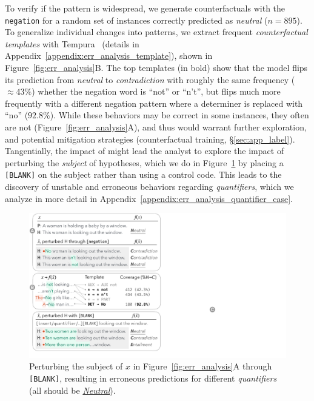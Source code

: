 To verify if the pattern is widespread, we generate counterfactuals with the \texttt{negation} \tagstr for a random set of instances correctly predicted as \emph{neutral} ($n=895$). To generalize individual changes into patterns, we extract frequent \emph{counterfactual templates} with Tempura~\cite{wu2020tempura} (details in Appendix~\ref{appendix:err_analysis_template}), shown in Figure~\ref{fig:err_analysis}B.
The top templates (in bold) show that the model flips its prediction from \emph{neutral} to \emph{contradiction} with roughly the same frequency (${\approx}43\%$) whether the negation word is ``not'' or ``n't'', but flips much more frequently with a different negation pattern where a determiner is replaced with ``no'' ($92.8\%$). While these behaviors may be correct in some instances, they often are not (\eg Figure~\ref{fig:err_analysis}A), and thus would warrant further exploration, and potential mitigation strategies (\eg counterfactual training, \S\ref{sec:app_label}).
Tangentially, the impact of  might lead the analyst to explore the impact of perturbing the \emph{subject} of hypotheses, which we do in Figure~\ref{fig:err_analysis_quantifier} by placing a \texttt{[BLANK]} on the subject rather than using a control code.
This leads to the discovery of unstable and erroneous behaviors regarding \emph{quantifiers}, which we analyze in more detail in Appendix~\ref{appendix:err_analysis_quantifier_case}.


\begin{figure}[t]
\centering
\includegraphics[trim={0.5cm 1.5cm 32.5cm 25.5cm}, clip,width=1\columnwidth]{figures/err_analysis.pdf}
\vspace{-15pt}
\caption{
Perturbing the subject of $x$ in Figure~\ref{fig:err_analysis}A through \texttt{[BLANK]}, resulting in erroneous predictions for different \emph{quantifiers}
(all should be \uline{\emph{Neutral}}). 
}
\vspace{-10pt}
\label{fig:err_analysis_quantifier}
\end{figure}


